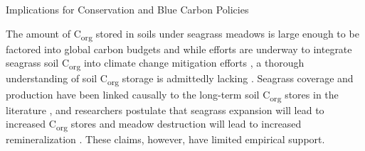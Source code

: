 \bigskip
\noindent Implications for Conservation and Blue Carbon Policies
\medskip

The amount of C\textsubscript{org} stored in soils under seagrass meadows is large enough to be factored into global carbon budgets \citep{Fourqurean:2012cv} and while efforts are underway to integrate seagrass soil C\textsubscript{org} into climate change mitigation efforts \citep{Duarte:2010dx, Duarte:2011da, Mcleod:2011gs}, a thorough understanding of soil C\textsubscript{org} storage is admittedly lacking \citep{Pendleton:2012hz, Macreadie:2014fz}. Seagrass coverage and production have been linked causally to the long-term soil C\textsubscript{org} stores in the literature \citep{Duarte:2010dx, Duarte:2011da}, and researchers postulate that seagrass expansion will lead to increased C\textsubscript{org} stores \citep{Duarte:2013ks} and meadow destruction will lead to increased remineralization \citep{Pendleton:2012hz, Fourqurean:2012cv}. These claims, however, have limited empirical support.


